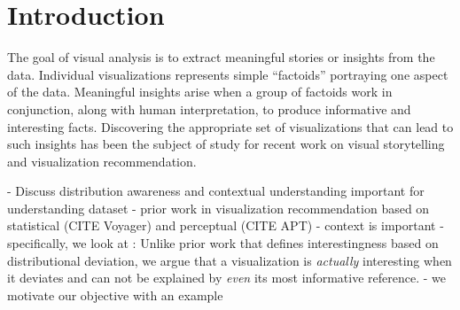 \section{Introduction}
\par The goal of visual analysis is to extract meaningful stories or insights from the data. Individual visualizations represents simple ``factoids'' portraying one aspect of the data. Meaningful insights arise when a group of factoids work in conjunction, along with human interpretation, to produce informative and interesting facts. Discovering the appropriate set of visualizations that can lead to such insights has been the subject of study for recent work on visual storytelling\cite{Kim2017,Hullman2017,Segel2010,Hullman2013} and visualization recommendation\cite{Vartak2015,Wongsuphasawat2016,Anand2015}. 


- Discuss distribution awareness and contextual understanding important for understanding dataset 
- prior work in visualization recommendation based on statistical (CITE Voyager) and perceptual (CITE APT)
- context is important 
- specifically, we look at : 
	Unlike prior work that defines interestingness based on distributional deviation, we argue that a visualization is \emph{actually} interesting when it deviates and can not be explained by \emph{even} its most informative reference. 
- we motivate our objective with an example


